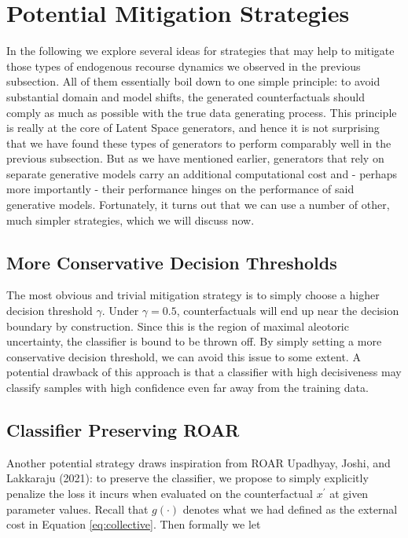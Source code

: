 \documentclass[conference,final,]{IEEEtran}
\begin{document}
\hypertarget{mitigate}{%
\section{Potential Mitigation Strategies}\label{mitigate}}

In the following we explore several ideas for strategies that may help to mitigate those types of endogenous recourse dynamics we observed in the previous subsection. All of them essentially boil down to one simple principle: to avoid substantial domain and model shifts, the generated counterfactuals should comply as much as possible with the true data generating process. This principle is really at the core of Latent Space generators, and hence it is not surprising that we have found these types of generators to perform comparably well in the previous subsection. But as we have mentioned earlier, generators that rely on separate generative models carry an additional computational cost and - perhaps more importantly - their performance hinges on the performance of said generative models. Fortunately, it turns out that we can use a number of other, much simpler strategies, which we will discuss now.

\hypertarget{more-conservative-decision-thresholds}{%
\subsection{More Conservative Decision Thresholds}\label{more-conservative-decision-thresholds}}

The most obvious and trivial mitigation strategy is to simply choose a higher decision threshold \(\gamma\). Under \(\gamma=0.5\), counterfactuals will end up near the decision boundary by construction. Since this is the region of maximal aleotoric uncertainty, the classifier is bound to be thrown off. By simply setting a more conservative decision threshold, we can avoid this issue to some extent. A potential drawback of this approach is that a classifier with high decisiveness may classify samples with high confidence even far away from the training data.

\hypertarget{classifier-preserving-roar}{%
\subsection{Classifier Preserving ROAR}\label{classifier-preserving-roar}}

Another potential strategy draws inspiration from ROAR Upadhyay, Joshi, and Lakkaraju (2021): to preserve the classifier, we propose to simply explicitly penalize the loss it incurs when evaluated on the counterfactual \(x^\prime\) at given parameter values. Recall that \(g(\cdot)\) denotes what we had defined as the external cost in Equation \eqref{eq:collective}. Then formally we let
\end{document}
